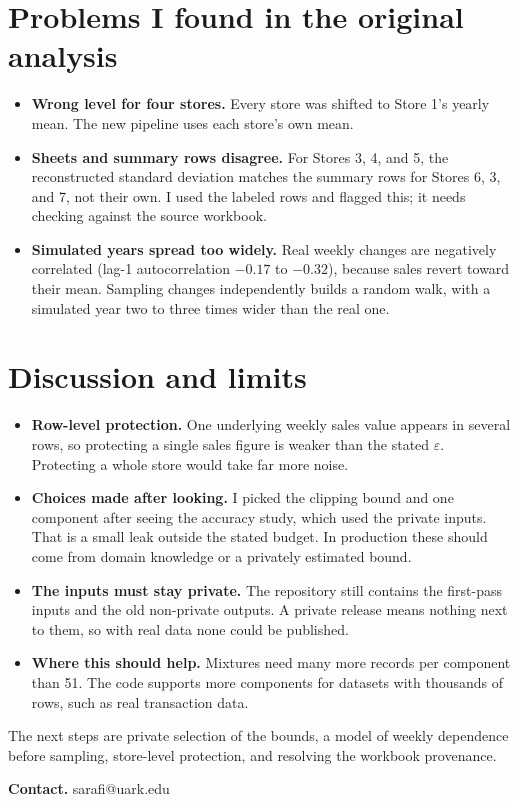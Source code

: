 \section{Problems I found in the original analysis}
\begin{itemize}
\item \textbf{Wrong level for four stores.} Every store was shifted to Store 1's yearly mean. The new pipeline uses each store's own mean.
\item \textbf{Sheets and summary rows disagree.} For Stores 3, 4, and 5, the reconstructed standard deviation matches the summary rows for Stores 6, 3, and 7, not their own. I used the labeled rows and flagged this; it needs checking against the source workbook.
\item \textbf{Simulated years spread too widely.} Real weekly changes are negatively correlated (lag-1 autocorrelation $-0.17$ to $-0.32$), because sales revert toward their mean. Sampling changes independently builds a random walk, with a simulated year two to three times wider than the real one.
\end{itemize}

\section{Discussion and limits}
\begin{itemize}
\item \textbf{Row-level protection.} One underlying weekly sales value appears in several rows, so protecting a single sales figure is weaker than the stated $\varepsilon$. Protecting a whole store would take far more noise.
\item \textbf{Choices made after looking.} I picked the clipping bound and one component after seeing the accuracy study, which used the private inputs. That is a small leak outside the stated budget. In production these should come from domain knowledge or a privately estimated bound.
\item \textbf{The inputs must stay private.} The repository still contains the first-pass inputs and the old non-private outputs. A private release means nothing next to them, so with real data none could be published.
\item \textbf{Where this should help.} Mixtures need many more records per component than 51. The code supports more components for datasets with thousands of rows, such as real transaction data.
\end{itemize}
The next steps are private selection of the bounds, a model of weekly dependence before sampling, store-level protection, and resolving the workbook provenance.

\textbf{Contact.} sarafi@uark.edu

